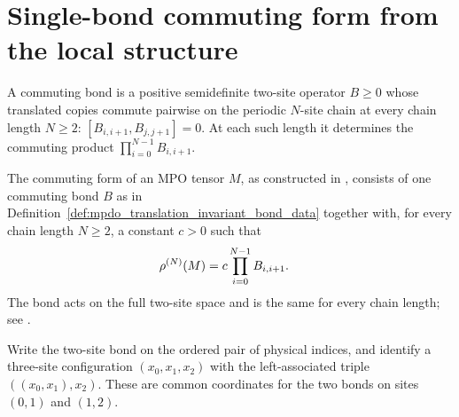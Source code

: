 \section{Single-bond commuting form from the local structure}

\begin{definition}
    \label{def:mpdo_translation_invariant_bond_data}
    \leanok
    A commuting bond is a positive semidefinite two-site operator $B\ge0$ whose
    translated copies commute pairwise on the periodic $N$-site chain at
    every chain length $N\ge2$: $[B_{i,i+1},B_{j,j+1}]=0$. At each such length
    it determines the commuting product $\prod_{i=0}^{N-1}B_{i,i+1}$.
\end{definition}

\begin{definition}
    \label{def:mpdo_eta_local_structure_data}
    \leanok
    The commuting form of an MPO tensor $M$, as constructed in
    \cite[Appendix~C.2, Proposition~C.8]{Cirac2016MPDO_arXiv}, consists of
    one commuting bond $B$ as in
    Definition~\ref{def:mpdo_translation_invariant_bond_data} together with,
    for every chain length $N\ge2$, a constant $c>0$ such that
    \begin{align}
        \rho^{(N)}(M)
         & =c\prod_{i=0}^{N-1}B_{i,i+1}.
        \notag
    \end{align}
    The bond acts on the full two-site space and is the same for every chain
    length; see \cite{gap:cpsv16_commuting_form_to_sal}.
\end{definition}

\begin{definition}
    \label{def:mpdo_three_site_overlapping_coordinates}
    \leanok
    Write the two-site bond on the ordered pair of physical indices, and
    identify a three-site configuration $(x_0,x_1,x_2)$ with the
    left-associated triple $((x_0,x_1),x_2)$. These are common coordinates
    for the two bonds on sites $(0,1)$ and $(1,2)$.
\end{definition}

